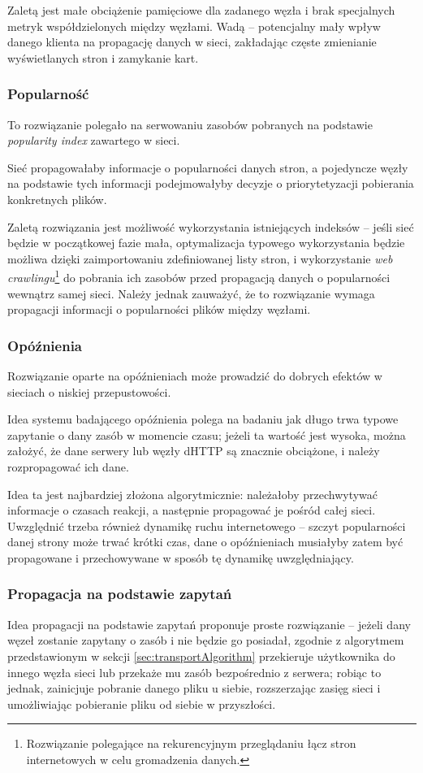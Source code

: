 Zaletą jest małe obciążenie pamięciowe dla zadanego węzła i brak specjalnych metryk współdzielonych między węzłami.
Wadą -- potencjalny mały wpływ danego klienta na propagację danych w sieci, zakładając częste zmienianie wyświetlanych stron i zamykanie kart.

\subsubsection{Popularność}
To rozwiązanie polegało na serwowaniu zasobów pobranych na podstawie {\em popularity index} zawartego w sieci.

Sieć propagowałaby informacje o popularności danych stron, a pojedyncze węzły na podstawie tych informacji podejmowałyby decyzje o priorytetyzacji pobierania konkretnych plików.

Zaletą rozwiązania jest możliwość wykorzystania istniejących indeksów -- jeśli sieć będzie w początkowej fazie mała, optymalizacja typowego wykorzystania będzie możliwa dzięki zaimportowaniu zdefiniowanej listy stron, i wykorzystanie {\em web crawlingu}\footnote{Rozwiązanie polegające na rekurencyjnym przeglądaniu łącz stron internetowych w celu gromadzenia danych.} do pobrania ich zasobów przed propagacją danych o popularności wewnątrz samej sieci. Należy jednak zauważyć, że to rozwiązanie wymaga propagacji informacji o popularności plików między węzłami.

\subsubsection{Opóźnienia}
Rozwiązanie oparte na opóźnieniach może prowadzić do dobrych efektów w sieciach o niskiej przepustowości.

Idea systemu badającego opóźnienia polega na badaniu jak długo trwa typowe zapytanie o dany zasób w momencie czasu; jeżeli ta wartość jest wysoka, można założyć, że dane serwery lub węzły dHTTP są znacznie obciążone, i należy rozpropagować ich dane.

Idea ta jest najbardziej złożona algorytmicznie: należałoby przechwytywać informacje o czasach reakcji, a następnie propagować je pośród całej sieci. Uwzględnić trzeba również dynamikę ruchu internetowego -- szczyt popularności danej strony może trwać krótki czas, dane o opóźnieniach musiałyby zatem być propagowane i przechowywane w sposób tę dynamikę uwzględniający.

\subsubsection{Propagacja na podstawie zapytań}
Idea propagacji na podstawie zapytań proponuje proste rozwiązanie -- jeżeli dany węzeł zostanie zapytany o zasób i nie będzie go posiadał, zgodnie z algorytmem przedstawionym w sekcji \ref{sec:transportAlgorithm} przekieruje użytkownika do innego węzła sieci lub przekaże mu zasób bezpośrednio z serwera; robiąc to jednak, zainicjuje pobranie danego pliku u siebie, rozszerzając zasięg sieci i umożliwiając pobieranie pliku od siebie w przyszłości.

